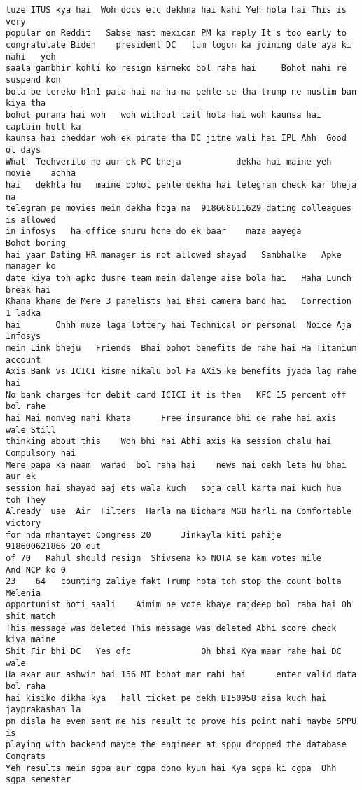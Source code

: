 \documentclass[11pt]{article}
\begin{document}
\begin{tcolorbox}[breakable, size=fbox, boxrule=.5pt, pad at break*=1mm, opacityfill=0]
\begin{Verbatim}[commandchars=\\\{\}]
tuze ITUS kya hai  Woh docs etc dekhna hai Nahi Yeh hota hai This is very
popular on Reddit   Sabse mast mexican PM ka reply It s too early to
congratulate Biden    president DC   tum logon ka joining date aya ki nahi   yeh
saala gambhir kohli ko resign karneko bol raha hai     Bohot nahi re suspend kon
bola be tereko h1n1 pata hai na ha na pehle se tha trump ne muslim ban kiya tha
bohot purana hai woh   woh without tail hota hai woh kaunsa hai captain holt ka
kaunsa hai cheddar woh ek pirate tha DC jitne wali hai IPL Ahh  Good ol days
What  Techverito ne aur ek PC bheja           dekha hai maine yeh movie    achha
hai   dekhta hu   maine bohot pehle dekha hai telegram check kar bheja na
telegram pe movies mein dekha hoga na  918668611629 dating colleagues is allowed
in infosys   ha office shuru hone do ek baar    maza aayega       Bohot boring
hai yaar Dating HR manager is not allowed shayad   Sambhalke   Apke manager ko
date kiya toh apko dusre team mein dalenge aise bola hai   Haha Lunch break hai
Khana khane de Mere 3 panelists hai Bhai camera band hai   Correction 1 ladka
hai       Ohhh muze laga lottery hai Technical or personal  Noice Aja Infosys
mein Link bheju   Friends  Bhai bohot benefits de rahe hai Ha Titanium account
Axis Bank vs ICICI kisme nikalu bol Ha AXiS ke benefits jyada lag rahe hai
No bank charges for debit card ICICI it is then   KFC 15 percent off bol rahe
hai Mai nonveg nahi khata      Free insurance bhi de rahe hai axis wale Still
thinking about this    Woh bhi hai Abhi axis ka session chalu hai Compulsory hai
Mere papa ka naam  warad  bol raha hai    news mai dekh leta hu bhai aur ek
session hai shayad aaj ets wala kuch   soja call karta mai kuch hua toh They
Already  use  Air  Filters  Harla na Bichara MGB harli na Comfortable victory
for nda mhantayet Congress 20      Jinkayla kiti pahije     918600621866 20 out
of 70   Rahul should resign  Shivsena ko NOTA se kam votes mile     And NCP ko 0
23    64   counting zaliye fakt Trump hota toh stop the count bolta     Melenia
opportunist hoti saali    Aimim ne vote khaye rajdeep bol raha hai Oh shit match
This message was deleted This message was deleted Abhi score check kiya maine
Shit Fir bhi DC   Yes ofc              Oh bhai Kya maar rahe hai DC wale
Ha axar aur ashwin hai 156 MI bohot mar rahi hai      enter valid data bol raha
hai kisiko dikha kya   hall ticket pe dekh B150958 aisa kuch hai jayprakashan la
pn disla he even sent me his result to prove his point nahi maybe SPPU is
playing with backend maybe the engineer at sppu dropped the database Congrats
Yeh results mein sgpa aur cgpa dono kyun hai Kya sgpa ki cgpa  Ohh sgpa semester

\end{Verbatim}
\end{tcolorbox}
\end{document}
